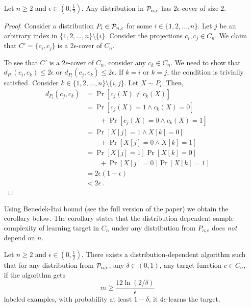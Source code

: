 \begin{lemma}
Let $n \ge 2$ and $\epsilon \in (0,\frac{1}{2})$. Any distribution in $\P_{n,\epsilon}$
has $2\epsilon$-cover of size $2$.
\end{lemma}

\begin{proof}
Consider a distribution $P_i \in \P_{n,\epsilon}$ for some $i \in \{1,2,\dots,n\}$.
Let $j$ be an arbitrary index in $\{1,2,\dots,n\} \setminus \{i\}$.
Consider the projections $c_i, c_j \in C_n$. We claim that $C' = \{c_i, c_j\}$
is a $2\epsilon$-cover of $C_n$.

To see that $C'$ is a $2\epsilon$-cover of $C_n$, consider any $c_k \in C_n$.
We need to show that $d_{P_i}(c_i, c_k) \le 2\epsilon$ or $d_{P_i}(c_j, c_k)
\le 2\epsilon$. If $k = i$ or $k = j$, the condition is trivially satisfied.
Consider $k \in \{1,2,\dots,n\} \setminus \{i,j\}$. Let $X \sim P_i$. Then,
\begin{align*}
d_{P_i}(c_j, c_k)
& = \Pr[c_j(X) \neq c_k(X)] \\
& = \Pr[c_j(X) = 1 \wedge c_k(X) = 0] \\
  & \qquad + \Pr[c_j(X) = 0 \wedge c_k(X) = 1] \\
& = \Pr[X[j] = 1 \wedge X[k] = 0]  \\
  & \qquad + \Pr[X[j] = 0 \wedge X[k] = 1] \\
& = \Pr[X[j] = 1] \Pr[X[k] = 0] \\
  & \qquad + \Pr[X[j] = 0] \Pr[X[k] = 1] \\
& = 2 \epsilon \left( 1 - \epsilon \right)  \\
& < 2 \epsilon \; .
\end{align*}
\end{proof}

Using Benedek-Itai bound (see the full version of the paper) we obtain the corollary below.
The corollary states that the distribution-dependent sample complexity
of learning target in $C_n$ under any distribution from $P_{n,\epsilon}$
does \emph{not} depend on $n$.

\begin{corollary}
Let $n \ge 2$ and $\epsilon \in (0,\frac{1}{2})$.  There exists a
distribution-dependent algorithm such that for any distribution from $\P_{n,\epsilon}$,
any $\delta \in (0,1)$, any target function $c \in C_n$, if the algorithm gets
$$
m \ge \frac{12\ln(2/\delta)}{\epsilon}
$$
labeled examples, with
probability at least $1 - \delta$, it $4\epsilon$-learns the target.
\end{corollary}

